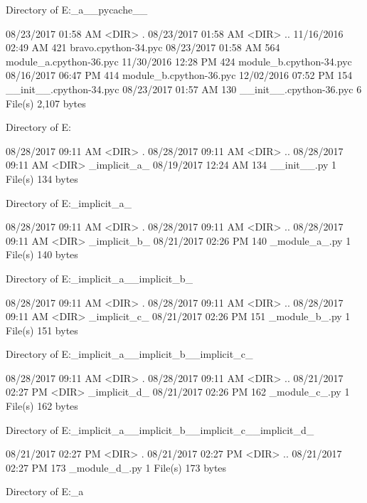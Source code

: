  Directory of E:\Python\apeman\mockup\simple\explicit_a\__pycache__

08/23/2017  01:58 AM    <DIR>          .
08/23/2017  01:58 AM    <DIR>          ..
11/16/2016  02:49 AM               421 bravo.cpython-34.pyc
08/23/2017  01:58 AM               564 module_a.cpython-36.pyc
11/30/2016  12:28 PM               424 module_b.cpython-34.pyc
08/16/2017  06:47 PM               414 module_b.cpython-36.pyc
12/02/2016  07:52 PM               154 __init__.cpython-34.pyc
08/23/2017  01:57 AM               130 __init__.cpython-36.pyc
               6 File(s)          2,107 bytes

 Directory of E:\Python\apeman\mockup\simple\implicit

08/28/2017  09:11 AM    <DIR>          .
08/28/2017  09:11 AM    <DIR>          ..
08/28/2017  09:11 AM    <DIR>          _implicit_a_
08/19/2017  12:24 AM               134 __init__.py
               1 File(s)            134 bytes

 Directory of E:\Python\apeman\mockup\simple\implicit\_implicit_a_

08/28/2017  09:11 AM    <DIR>          .
08/28/2017  09:11 AM    <DIR>          ..
08/28/2017  09:11 AM    <DIR>          _implicit_b_
08/21/2017  02:26 PM               140 _module_a_.py
               1 File(s)            140 bytes

 Directory of E:\Python\apeman\mockup\simple\implicit\_implicit_a_\_implicit_b_

08/28/2017  09:11 AM    <DIR>          .
08/28/2017  09:11 AM    <DIR>          ..
08/28/2017  09:11 AM    <DIR>          _implicit_c_
08/21/2017  02:26 PM               151 _module_b_.py
               1 File(s)            151 bytes

 Directory of E:\Python\apeman\mockup\simple\implicit\_implicit_a_\_implicit_b_\_implicit_c_

08/28/2017  09:11 AM    <DIR>          .
08/28/2017  09:11 AM    <DIR>          ..
08/21/2017  02:27 PM    <DIR>          _implicit_d_
08/21/2017  02:26 PM               162 _module_c_.py
               1 File(s)            162 bytes

 Directory of E:\Python\apeman\mockup\simple\implicit\_implicit_a_\_implicit_b_\_implicit_c_\_implicit_d_

08/21/2017  02:27 PM    <DIR>          .
08/21/2017  02:27 PM    <DIR>          ..
08/21/2017  02:27 PM               173 _module_d_.py
               1 File(s)            173 bytes

 Directory of E:\Python\apeman\mockup\simple\implicit_a

